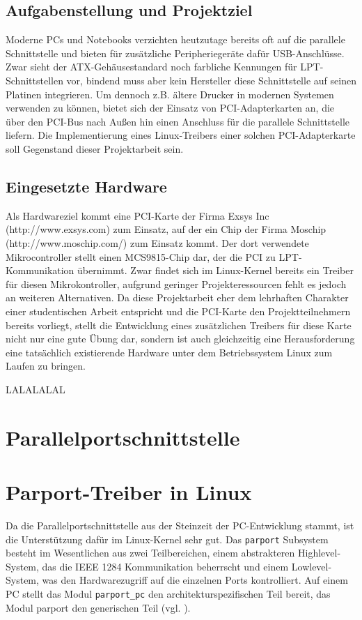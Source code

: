 \documentclass[a4paper,11pt]{article}
\begin{document}
 
\subsection{Aufgabenstellung und Projektziel}

Moderne PCs und Notebooks verzichten heutzutage bereits oft auf die parallele Schnittstelle und bieten für zusätzliche Peripheriegeräte dafür USB-Anschlüsse. Zwar sieht der ATX-Gehäusestandard noch farbliche Kennungen für LPT-Schnittstellen vor, bindend muss aber kein Hersteller diese Schnittstelle auf seinen Platinen integrieren. Um dennoch z.B. ältere Drucker in modernen Systemen verwenden zu können, bietet sich der Einsatz von PCI-Adapterkarten an, die über den PCI-Bus nach Außen hin einen Anschluss für die parallele Schnittstelle liefern. Die Implementierung eines Linux-Treibers einer solchen PCI-Adapterkarte soll Gegenstand dieser Projektarbeit sein. 

\subsection{Eingesetzte Hardware}  

Als Hardwareziel kommt eine PCI-Karte der Firma Exsys Inc (http://www.exsys.com) zum Einsatz, auf der ein Chip der Firma Moschip (http://www.moschip.com/) zum Einsatz kommt. Der dort verwendete Mikrocontroller stellt einen MCS9815-Chip dar, der die PCI zu LPT-Kommunikation übernimmt. Zwar findet sich im Linux-Kernel bereits ein Treiber für diesen Mikrokontroller, aufgrund geringer Projekteressourcen fehlt es jedoch an weiteren Alternativen. Da diese Projektarbeit eher dem lehrhaften Charakter einer studentischen Arbeit entspricht und die PCI-Karte den Projektteilnehmern bereits vorliegt, stellt die Entwicklung eines zusätzlichen Treibers für diese Karte nicht nur eine gute Übung dar, sondern ist auch gleichzeitig eine Herausforderung eine tatsächlich existierende Hardware unter dem Betriebssystem Linux zum Laufen zu bringen.  


LALALALAL

\section{Parallelportschnittstelle}

\section{Parport-Treiber in Linux}

Da die Parallelportschnittstelle aus der Steinzeit der PC-Entwicklung stammt, ist die Unterstützung
dafür im Linux-Kernel sehr gut. 
Das \verb|parport| Subsystem besteht im Wesentlichen aus zwei Teilbereichen, einem abstrakteren Highlevel-System, das
die IEEE 1284 Kommunikation beherrscht und einem Lowlevel-System, was den Hardwarezugriff auf die einzelnen Ports
kontrolliert. Auf einem PC stellt das Modul \verb|parport_pc| den architekturspezifischen Teil bereit, das Modul parport 
den generischen Teil (vgl. \cite{net:1}).
\end{document}
